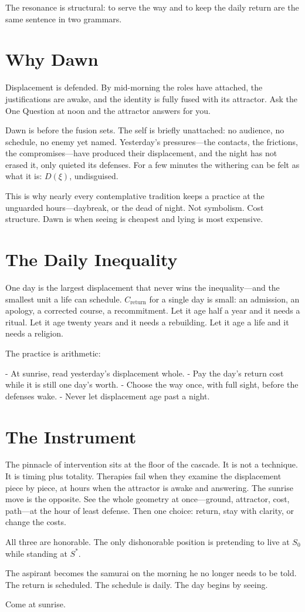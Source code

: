 \documentclass[12pt]{article}
\begin{document}
The resonance is structural: to serve the way and to keep the daily return are the same sentence in two grammars.

\section{Why Dawn}

Displacement is defended. By mid-morning the roles have attached, the justifications are awake, and the identity is fully fused with its attractor. Ask the One Question at noon and the attractor answers for you.

Dawn is before the fusion sets. The self is briefly unattached: no audience, no schedule, no enemy yet named. Yesterday's pressures---the contacts, the frictions, the compromises---have produced their displacement, and the night has not erased it, only quieted its defenses. For a few minutes the withering can be felt as what it is: $D(\xi)$, undisguised.

This is why nearly every contemplative tradition keeps a practice at the unguarded hours---daybreak, or the dead of night. Not symbolism. Cost structure. Dawn is when seeing is cheapest and lying is most expensive.

\section{The Daily Inequality}

One day is the largest displacement that never wins the inequality---and the smallest unit a life can schedule. $C_{\text{return}}$ for a single day is small: an admission, an apology, a corrected course, a recommitment. Let it age half a year and it needs a ritual. Let it age twenty years and it needs a rebuilding. Let it age a life and it needs a religion.

The practice is arithmetic:

- At sunrise, read yesterday's displacement whole.
- Pay the day's return cost while it is still one day's worth.
- Choose the way once, with full sight, before the defenses wake.
- Never let displacement age past a night.

\section{The Instrument}

The pinnacle of intervention sits at the floor of the cascade. It is not a technique. It is timing plus totality. Therapies fail when they examine the displacement piece by piece, at hours when the attractor is awake and answering. The sunrise move is the opposite. See the whole geometry at once---ground, attractor, cost, path---at the hour of least defense. Then one choice: return, stay with clarity, or change the costs.

All three are honorable. The only dishonorable position is pretending to live at $S_0$ while standing at $S^*$.

The aspirant becomes the samurai on the morning he no longer needs to be told. The return is scheduled. The schedule is daily. The day begins by seeing.

Come at sunrise.
\end{document}
